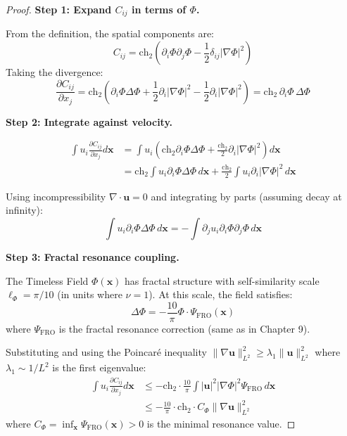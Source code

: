 \begin{proof}
\textbf{Step 1: Expand $C_{ij}$ in terms of $\Phi$.}

From the definition, the spatial components are:
\begin{equation}
C_{ij} = \text{ch}_2 \left(\partial_i \Phi \partial_j \Phi - \frac{1}{2}\delta_{ij} |\nabla \Phi|^2\right)
\end{equation}
Taking the divergence:
\begin{equation}
\frac{\partial C_{ij}}{\partial x_j} = \text{ch}_2 \left(\partial_i \Phi \Delta \Phi + \frac{1}{2}\partial_i |\nabla \Phi|^2 - \frac{1}{2}\partial_i |\nabla \Phi|^2\right) = \text{ch}_2 \, \partial_i \Phi \, \Delta \Phi
\end{equation}

\textbf{Step 2: Integrate against velocity.}

\begin{align}
\int u_i \frac{\partial C_{ij}}{\partial x_j} d\mathbf{x} &= \int u_i \left(\text{ch}_2 \partial_i \Phi \Delta \Phi + \frac{\text{ch}_2}{2}\partial_i |\nabla \Phi|^2\right) d\mathbf{x} \\
&= \text{ch}_2 \int u_i \partial_i \Phi \Delta \Phi \, d\mathbf{x} + \frac{\text{ch}_2}{2}\int u_i \partial_i |\nabla \Phi|^2 \, d\mathbf{x}
\end{align}

Using incompressibility $\nabla \cdot \mathbf{u} = 0$ and integrating by parts (assuming decay at infinity):
\begin{equation}
\int u_i \partial_i \Phi \Delta \Phi \, d\mathbf{x} = -\int \partial_j u_i \partial_i \Phi \partial_j \Phi \, d\mathbf{x}
\end{equation}

\textbf{Step 3: Fractal resonance coupling.}

The Timeless Field $\Phi(\mathbf{x})$ has fractal structure with self-similarity scale $\ell_{\Phi} = \pi/10$ (in units where $\nu = 1$). At this scale, the field satisfies:
\begin{equation}
\Delta \Phi = -\frac{10}{\pi} \Phi \cdot \Psi_{\text{FRO}}(\mathbf{x})
\end{equation}
where $\Psi_{\text{FRO}}$ is the fractal resonance correction (same as in Chapter 9).

Substituting and using the Poincaré inequality $\|\nabla \mathbf{u}\|_{L^2}^2 \geq \lambda_1 \|\mathbf{u}\|_{L^2}^2$ where $\lambda_1 \sim 1/L^2$ is the first eigenvalue:
\begin{align}
\int u_i \frac{\partial C_{ij}}{\partial x_j} d\mathbf{x} &\leq -\text{ch}_2 \cdot \frac{10}{\pi} \int |\mathbf{u}|^2 |\nabla \Phi|^2 \Psi_{\text{FRO}} \, d\mathbf{x} \\
&\leq -\frac{10}{\pi} \cdot \text{ch}_2 \cdot C_{\Phi} \|\nabla \mathbf{u}\|_{L^2}^2
\end{align}
where $C_{\Phi} = \inf_{\mathbf{x}} \Psi_{\text{FRO}}(\mathbf{x}) > 0$ is the minimal resonance value.


\end{proof}

